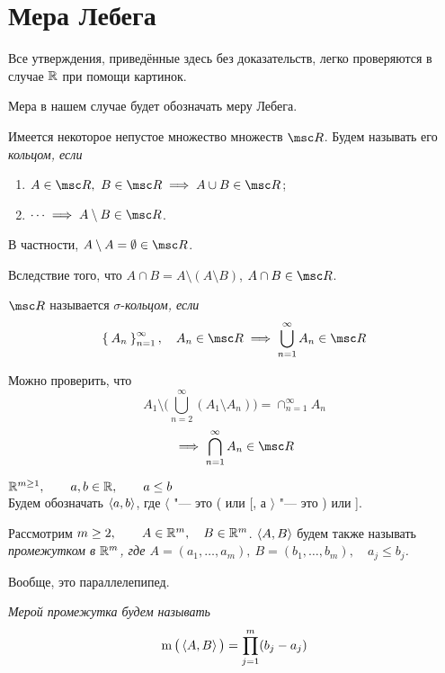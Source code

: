 \chapter{Мера Лебега}

Все утверждения, приведённые здесь без доказательств, легко проверяются в случае $ \mathbb{R} $ при помощи картинок.

Мера в нашем случае будет обозначать меру Лебега.

\begin{definition}
	Имеется некоторое непустое множество множеств $ \msc R $. Будем называть его \it{кольцом}, если
	\begin{enumerate}
		\item $ A \in \msc R, ~ B \in \msc R \implies A \cup B \in \msc R $;
		\item $ \dots \implies A \setminus B \in \msc R $.
	\end{enumerate}
\end{definition}

В частности, $ A \setminus A = \O \in \msc R $.

Вследствие того, что $ A \cap B = A \setminus (A \setminus B) $, $ A \cap B \in \msc R $.

\begin{definition}
	$ \msc R $ называется $ \sigma $-\it{кольцом}, если
	$$ \set{A_n}_{n = 1}^\infty, \quad A_n \in \msc R \implies \bigcup_{n = 1}^\infty A_n \in \msc R $$
\end{definition}

Можно проверить, что
$$ A_1 \setminus \bigg( \bigcup_{n = 2}^\infty (A_1 \setminus A_n) \bigg) = \cap_{n = 1}^\infty A_n $$
$$ \implies \bigcap_{n = 1}^\infty A_n \in \msc R $$

$ \mathbb{R}^{m \ge 1}, \qquad a, b \in \mathbb{R}, \qquad a \le b $ \\
Будем обозначать $ \Braket{a, b} $, где $ \langle $ "--- это ( или [, а $ \rangle $ "--- это ) или ].

Рассмотрим $ m \ge 2, \qquad A \in \mathbb{R}^m, \quad B \in \mathbb{R}^m $. $ \Braket{A, B} $ будем также называть \it{промежутком} в $ \mathbb{R}^m $, где $ A = (a_1, \dots, a_m), ~ B = (b_1, \dots, b_m), \quad a_j \le b_j $.

\begin{remark}
	Вообще, это параллелепипед.
\end{remark}

\begin{definition}
	\it{Мерой} промежутка будем называть
	$$ \operatorname m \big( \Braket{A, B} \big) = \prod_{j = 1}^m (b_j - a_j) $$
\end{definition}

